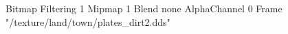 {Bitmap
	{Filtering 1}
	{Mipmap 1}
	{Blend none}
	{AlphaChannel 0}
	{Frame "/texture/land/town/plates_dirt2.dds"}
}
